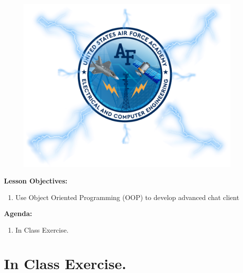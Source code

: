 \documentclass{handout}
\begin{document}
\maketitle

\begin{figure}[H]
	\centering
	\includegraphics[width=.75\textwidth]{Cover.PNG}
\end{figure}

\textbf{Lesson Objectives:}
\begin{enumerate} \setlength\itemsep{0em}
	\item Use Object Oriented Programming (OOP) to develop advanced chat client
\end{enumerate}

\textbf{Agenda:}
\begin{enumerate} \setlength\itemsep{0em}
	\item In Class Exercise.
\end{enumerate}

\newpage
\clearpage
\pagebreak

\section{In Class Exercise.}
\end{document}
